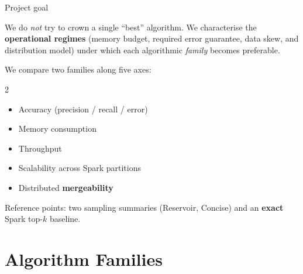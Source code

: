 \documentclass[11pt,aspectratio=169]{beamer}
\begin{document}
\begin{frame}{Project goal}
  \begin{alertblock}{We do \emph{not} try to crown a single ``best'' algorithm.}
    We characterise the \textbf{operational regimes} (memory budget, required
    error guarantee, data skew, and distribution model) under which each
    algorithmic \emph{family} becomes preferable.
  \end{alertblock}
  \vspace{0.5em}
  We compare two families along five axes:
  \begin{multicols}{2}
    \begin{itemize}
      \item Accuracy (precision / recall / error)
      \item Memory consumption
      \item Throughput
      \item Scalability across Spark partitions
      \item Distributed \textbf{mergeability}
    \end{itemize}
  \end{multicols}
  \vspace{0.3em}
  Reference points: two sampling summaries (Reservoir, Concise) and an
  \textbf{exact} Spark top-$k$ baseline.
\end{frame}

\section{Algorithm Families}
\end{document}
